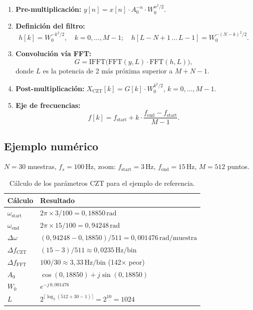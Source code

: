 \documentclass[12pt, a4paper, twoside]{report}
\begin{document}
\begin{enumerate}
  \item \textbf{Pre-multiplicación:}
    $y[n] = x[n]\cdot A_0^{-n}\cdot W_0^{n^2/2}$.

  \item \textbf{Definición del filtro:}
    \begin{equation*}
      h[k] = W_0^{-k^2/2}, \quad k = 0,\ldots,M-1; \quad
      h[L-N+1\,\ldots\,L-1] = W_0^{-(N-k)^2/2}.
    \end{equation*}

  \item \textbf{Convolución vía FFT:}
    \begin{equation*}
      G = \text{IFFT}\!\bigl(\text{FFT}(y,L)\cdot\text{FFT}(h,L)\bigr),
    \end{equation*}
    donde $L$ es la potencia de 2 más próxima superior a $M+N-1$.

  \item \textbf{Post-multiplicación:}
    $X_\text{CZT}[k] = G[k]\cdot W_0^{k^2/2}$, \quad $k=0,\ldots,M-1$.

  \item \textbf{Eje de frecuencias:}
    \begin{equation}
      f[k] = f_\text{start} + k\cdot\frac{f_\text{end}-f_\text{start}}{M-1}.
      \label{eq:eje_f}
    \end{equation}
\end{enumerate}

\subsection{Ejemplo numérico}
\label{sub:ejemplo_czt}

$N = 30$ muestras, $f_s = 100\,\text{Hz}$, zoom: $f_\text{start}=3\,\text{Hz}$,
$f_\text{end}=15\,\text{Hz}$, $M=512$ puntos.

\begin{table}[H]
  \centering
  \caption{Cálculo de los parámetros CZT para el ejemplo de referencia.}
  \label{tab:ejemplo_czt}
  \begin{tabular}{ll}
    \toprule
    \textbf{Cálculo} & \textbf{Resultado} \\
    \midrule
    $\omega_\text{start}$ & $2\pi\times3/100 = 0{,}18850\,\text{rad}$ \\
    $\omega_\text{end}$   & $2\pi\times15/100 = 0{,}94248\,\text{rad}$ \\
    $\Delta\omega$         & $(0{,}94248-0{,}18850)/511 = 0{,}001476\,\text{rad/muestra}$ \\
    $\Delta f_\text{CZT}$ & $(15-3)/511 \approx 0{,}0235\,\text{Hz/bin}$ \\
    $\Delta f_\text{FFT}$ & $100/30 \approx 3{,}33\,\text{Hz/bin}$ (142$\times$ peor) \\
    $A_0$                 & $\cos(0{,}18850)+j\sin(0{,}18850)$ \\
    $W_0$                 & $e^{-j\,0{,}001476}$ \\
    $L$                   & $2^{\lceil\log_2(512+30-1)\rceil} = 2^{10} = 1024$ \\
    \bottomrule
  \end{tabular}
\end{table}
\end{document}
